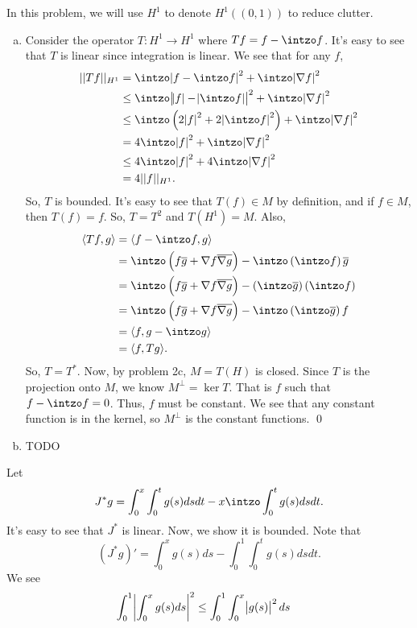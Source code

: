 \documentclass{article}
\newcommand{\D}{\nabla}
\begin{document}
\newpage
{} 
 \tri
\hop 
\solution
In this problem, we will use $H^1$ to denote $H^1((0,1))$ to reduce clutter.
\begin{enumerate}[(a)]
    \item Consider the operator $T: H^1 \to H^1$ where $Tf = f - \intzo f$. It's easy to see that $T$ is linear since integration is linear. We see that for any $f$, %
    \begin{align*}
        ||Tf||_{H^1} &= \intzo \abs{f - \intzo f}^2 + \intzo \abs{\D f}^2 \\
        &\le  \intzo \abs{\abs{f} - \abs{\intzo f}}^2 + \intzo \abs{\D f} ^2\\
        &\le  \intzo \del{2\abs{f}^2 +2 \abs{\intzo f}^2} + \intzo \abs{\D f}^2 \\
        &=  4\intzo \abs{f}^2 + \intzo \abs{\D f}^2 \\
        &\le  4\intzo \abs{f}^2 + 4\intzo \abs{\D f}^2 \\
        &= 4||f||_{H^1}.
    \end{align*}
    So, $T$ is bounded. It's easy to see that $T(f) \in M$ by definition, and if $f \in M$, then $T(f) = f$. So, $T = T^2$ and $T(H^1) = M$. Also, 
    \begin{align*}
        \ang{Tf, g} &= \ang{f-\intzo f, g } \\ 
        &= \intzo \del{f \ol{g} + \D f \ol{\D g}} - \intzo \del{\intzo f}\ol{g} \\
        &= \intzo \del{f \ol{g} + \D f \ol{\D g}} - \del{\intzo\ol{g}} \del{\intzo f} \\
        &= \intzo \del{f \ol{g} + \D f \ol{\D g}} - \intzo \del{\intzo \ol{g}}f \\
        &=\ang{f, g - \intzo g} \\
        &= \ang{f, Tg}.
    \end{align*}
    So, $T = T^*$. Now, by problem 2c, $M = T(H)$ is closed. 
    \hop 
    Since $T$ is the projection onto $M$, we know $M^\perp = \ker T$. That is $f$ such that $f - \intzo f = 0$. Thus, $f$ must be constant. We see that any constant function is in the kernel, so $M^\perp$ is the constant functions. \qed
    \item TODO
\end{enumerate}

\newpage
{} 
 \tri
\hop 
\solution
Let 
\[J^*g = \int_0^x\int_0^t g(s)dsdt - x\intzo\int_0^t g(s)ds dt. \]
It's easy to see that $J^*$ is linear. Now, we show it is bounded. Note that 
\[(J^*g)' = \int_0^x g(s) ds - \int_0^1 \int_0^t g(s)ds dt.\]
We see 
\begin{align*}
    \int_0^1 \abs{\int_0^x g(s) ds}^2 &\le  \int_0^1 \int_0^x \abs{g(s)}^2 ds
\end{align*}
\end{document}
